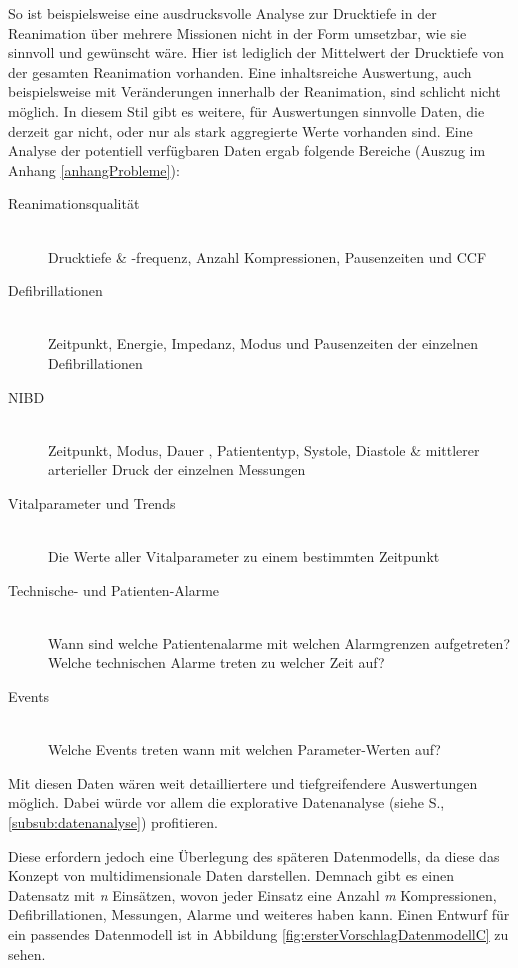 So ist beispielsweise eine ausdrucksvolle Analyse zur Drucktiefe in der Reanimation über mehrere Missionen nicht in der Form umsetzbar, wie sie sinnvoll und gewünscht wäre.
Hier ist lediglich der Mittelwert der Drucktiefe von der gesamten Reanimation vorhanden.
Eine inhaltsreiche Auswertung, auch beispielsweise mit Veränderungen innerhalb der Reanimation, sind schlicht nicht möglich.
In diesem Stil gibt es weitere, für Auswertungen sinnvolle Daten, die derzeit gar nicht, oder nur als stark aggregierte Werte vorhanden sind.
Eine Analyse der potentiell verfügbaren Daten ergab folgende Bereiche (Auszug im Anhang \ref{anhangProbleme}):  %
\begin{description}
\item [Reanimationsqualität]\hfill \\
Drucktiefe \& -frequenz, Anzahl Kompressionen, Pausenzeiten und \gls{CCF}
\item [Defibrillationen]\hfill \\
Zeitpunkt, Energie, Impedanz, Modus und Pausenzeiten der einzelnen Defibrillationen
\item [\gls{NIBD}]\hfill \\
Zeitpunkt, Modus, Dauer , Patiententyp, Systole, Diastole \& mittlerer arterieller Druck der einzelnen Messungen
\item [Vitalparameter und Trends]\hfill \\
Die Werte aller Vitalparameter zu einem bestimmten Zeitpunkt
\item [Technische- und Patienten-Alarme]\hfill \\
Wann sind welche Patientenalarme mit welchen Alarmgrenzen aufgetreten? \\
Welche technischen Alarme treten zu welcher Zeit auf?
\item [Events]\hfill \\
Welche Events treten wann mit welchen Parameter-Werten auf?
\end{description}

Mit diesen Daten wären weit detailliertere und tiefgreifendere Auswertungen möglich. 
Dabei würde vor allem die explorative Datenanalyse (siehe S.\pageref{subsub:datenanalyse}, \ref{subsub:datenanalyse}) profitieren.

Diese erfordern jedoch eine Überlegung des späteren Datenmodells, da diese das Konzept von multidimensionale Daten darstellen.
Demnach gibt es einen Datensatz mit \textit{n} Einsätzen, wovon jeder Einsatz eine Anzahl \textit{m} Kompressionen, Defibrillationen, Messungen, Alarme und weiteres haben kann.
Einen Entwurf für ein passendes Datenmodell ist in Abbildung \ref{fig:ersterVorschlagDatenmodellC} zu sehen.

